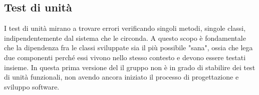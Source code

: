 \subsection{Test di unità}
I test di unità mirano a trovare errori verificando singoli metodi, singole classi, indipendentemente dal sistema che le circonda. A questo scopo è fondamentale che la dipendenza fra le classi sviluppate sia il più possibile "sana", ossia che lega due componenti perché essi vivono nello stesso contesto e devono essere testati insieme. 
In questa prima versione del \PdQv{} il gruppo non è in grado di stabilire dei test di unità funzionali, non avendo ancora iniziato il processo di progettazione e sviluppo software.